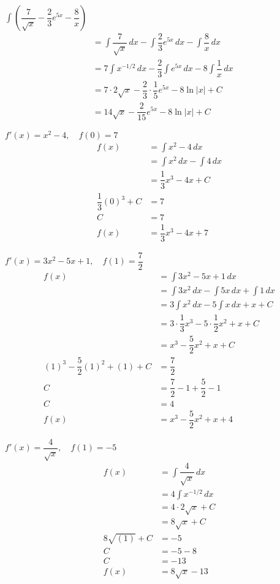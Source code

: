 \documentclass[12pt]{article}
\newenvironment{problem}[2][]{
    \begin{trivlist}
        \item[
            {\bfseries #1}
            {\bfseries #2.}
        ]
}{\end{trivlist}}
\begin{document}
\begin{problem}{45}
$\displaystyle\int \left(\dfrac{7}{\sqrt{x}} - \dfrac{2}{3} e^{5x} - \dfrac{8}{x}\right)$
\begin{align}
&= \int \dfrac{7}{\sqrt{x}} \, dx - \int \dfrac{2}{3} e^{5x} \, dx - \int \dfrac{8}{x} \, dx \\
&= 7 \int x^{-1/2} \, dx - \dfrac{2}{3} \int e^{5x} \, dx - 8 \int \dfrac{1}{x} \, dx \\
&= 7 \cdot 2\sqrt{x} - \dfrac{2}{3} \cdot \dfrac{1}{5} e^{5x} - 8 \ln{|x|} + C \\
&= 14\sqrt{x} - \dfrac{2}{15} e^{5x} - 8 \ln{|x|} + C 
\end{align}
\end{problem}

\begin{problem}{49}
$f'(x) = x^2 - 4, \quad f(0) = 7$
\begin{align}
f(x) &= \int x^2 - 4 \, dx \\
&= \int x^2 \, dx - \int 4 \, dx \\
&= \dfrac{1}{3} x^3 - 4x + C \\
\dfrac{1}{3} (0)^3 + C &= 7 \\
C &= 7 \\
f(x) &= \dfrac{1}{3} x^3 - 4x + 7
\end{align}
\end{problem}

\begin{problem}{53}
$f'(x) = 3x^2 - 5x + 1, \quad f(1) = \dfrac{7}{2}$
\begin{align}
f(x) &= \int 3x^2 - 5x + 1 \, dx \\
&= \int 3x^2 \, dx - \int 5x \, dx + \int 1 \, dx \\
&= 3 \int x^2 \, dx - 5 \int x \, dx + x + C \\
&= 3 \cdot \dfrac{1}{3} x^3 - 5 \cdot \dfrac{1}{2} x^2 + x + C \\
&= x^3 - \dfrac{5}{2} x^2 + x + C \\
(1)^3 - \dfrac{5}{2} (1)^2 + (1) + C &= \dfrac{7}{2} \\
C &= \dfrac{7}{2} - 1 + \dfrac{5}{2} - 1 \\
C &= 4 \\
f(x) &= x^3 - \dfrac{5}{2} x^2 + x + 4
\end{align}
\end{problem}

\begin{problem}{57}
$f'(x) = \dfrac{4}{\sqrt{x}}, \quad f(1) = -5$
\begin{align}
f(x) &= \int \dfrac{4}{\sqrt{x}} \, dx \\
&= 4 \int x^{-1/2} \, dx \\
&= 4 \cdot 2 \sqrt{x} + C \\
&= 8 \sqrt{x} + C \\
8 \sqrt{(1)} + C &= -5 \\
C &= -5 - 8 \\
C &= -13 \\
f(x) &= 8 \sqrt{x} - 13
\end{align}
\end{problem}
\end{document}
